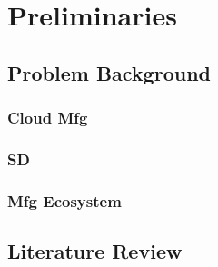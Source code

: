 \section{Preliminaries} %

\subsection{Problem Background} %
\label{sub:problem_background}

\subsubsection{Cloud Mfg}

\subsubsection{SD}

\subsubsection{Mfg Ecosystem}

 

\subsection{Literature Review} %
\label{sub:literature_review}




